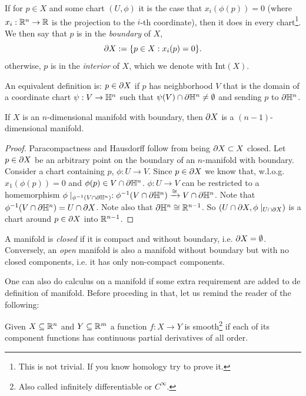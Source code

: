 \begin{defn}
    If for $p \in X$ and some chart $(U, \phi)$ it is the case that $x_i(\phi (p) )= 0$ (where $x_i:\mathbb{R}^n\to\mathbb{R}$ is the projection to the $i$-th coordinate), then it does in every chart\footnote{This is not trivial. If you know homology try to prove it.}. We then say that $p$ is in the \textit{boundary} of $X$, 
    $$
        \partial X := \{ p \in X : x_i(p) = 0\}.
    $$
    otherwise, $p$ is in the \textit{interior} of $X$, which we denote with Int$(X)$. 

    \noindent An equivalent definition is: $p \in \partial X$ if $p$ has neighborhood $V$ that is the domain of a coordinate chart $\psi:V\to\mathbb{H}^n$ such that $\psi(V)\cap\partial\mathbb{H}^n\neq\emptyset$ and sending $p$ to $\partial \mathbb{H}^n$.
\end{defn}


\begin{lem}
    If $X$ is an $n$-dimensional manifold with boundary, then $\partial X$ is a $(n-1)$-dimensional manifold.
\end{lem}
\begin{proof}
    Paracompactness and Hausdorff follow from being $\partial X\subset X$ closed. Let $p\in\partial X$ be an arbitrary point on the boundary of an $n$-manifold with boundary. Consider a chart containing $p$, $\phi:U\to V$. Since $p\in\partial X$ we know that, w.l.o.g. $x_1(\phi(p))=0$ and $\phi(p)\in V\cap\partial\mathbb{H}^n$. $\phi:U\to V$ can be restricted to a homemorphism $\phi\mid_{\phi^{-1}(V\cap\partial\mathbb{H}^n)}:\phi^{-1}(V\cap\partial\mathbb{H}^n)\xrightarrow{\cong}V\cap\partial\mathbb{H}^n$. Note that $\phi^{-1}(V\cap\partial\mathbb{H}^n)=U\cap\partial X$. Note also that $\partial\mathbb{H}^n\cong\mathbb{R}^{n-1}$. So $(U\cap\partial X, \phi\mid_{U\cap\partial X})$ is a chart around $p\in\partial X$ into $\mathbb{R}^{n-1}$.
\end{proof}
\begin{defn}
    A manifold is \textit{closed} if it is compact and without boundary, i.e. $\partial X = \emptyset$. Conversely, an \textit{open} manifold is also a manifold without boundary but with no closed components, i.e. it has only non-compact components. 
\end{defn}

One can also do calculus on a manifold if some extra requirement are added to de definition of manifold. Before proceding in that, let us remind the reader of the following:
\begin{defn}
    Given $X\subseteq\mathbb{R}^n$ and $Y\subseteq\mathbb{R}^m$ a function $f:X\to Y$ is smooth\footnote{Also called infinitely differentiable or $C^\infty$.} if each of its component functions has continuous partial derivatives of all order.
\end{defn}

